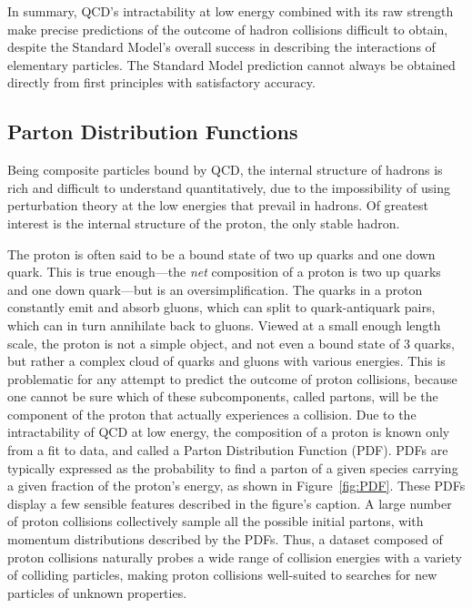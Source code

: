   In summary, QCD's intractability at low energy combined with its raw strength make precise predictions of the outcome of hadron collisions difficult to obtain, despite the Standard Model's overall success in describing the interactions of elementary particles.
  The Standard Model prediction cannot always be obtained directly from first principles with satisfactory accuracy.

  \subsection{Parton Distribution Functions} \label{sec:PDFs}

  Being composite particles bound by QCD, the internal structure of hadrons is rich and difficult to understand quantitatively, due to the impossibility of using perturbation theory at the low energies that prevail in hadrons.
  Of greatest interest is the internal structure of the proton, the only stable hadron.

  The proton is often said to be a bound state of two up quarks and one down quark.
  This is true enough---the {\it net} composition of a proton is two up quarks and one down quark---but is an oversimplification.
  The quarks in a proton constantly emit and absorb gluons, which can split to quark-antiquark pairs, which can in turn annihilate back to gluons.
  Viewed at a small enough length scale, the proton is not a simple object, and not even a bound state of 3 quarks, but rather a complex cloud of quarks and gluons with various energies.
  This is problematic for any attempt to predict the outcome of proton collisions, because one cannot be sure which of these subcomponents, called partons, will be the component of the proton that actually experiences a collision.
  Due to the intractability of QCD at low energy, the composition of a proton is known only from a fit to data, and called a Parton Distribution Function (PDF).
  PDFs are typically expressed as the probability to find a parton of a given species carrying a given fraction of the proton's energy, as shown in Figure~\ref{fig:PDF}.
  These PDFs display a few sensible features described in the figure's caption.
  A large number of proton collisions collectively sample all the possible initial partons, with momentum distributions described by the PDFs.
  Thus, a dataset composed of proton collisions naturally probes a wide range of collision energies with a variety of colliding particles, making proton collisions well-suited to searches for new particles of unknown properties.

